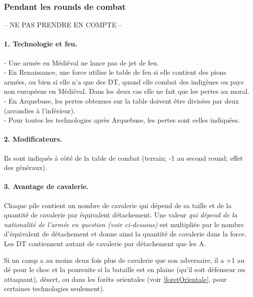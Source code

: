 \subsubsection{Pendant les rounds de combat}
-- NE PAS PRENDRE EN COMPTE --


\paragraph{1. Technologie et feu.}
- Une armée en Médiéval ne lance pas de jet de feu. \\
- En Renaissance, une force utilise le table de feu si elle contient des pions armées, ou bien
si elle n'a que des DT, quand elle combat des indigènes ou pays non européens en Médiéval.
Dans les deux cas elle ne fait que les pertes au moral. \\
- En Arquebuse, les pertes obtenues sur la table doivent être divisées par deux 
(arrondies à l'inférieur). \\
- Pour toutes les technologies après Arquebuse,  les pertes sont celles indiquées.

\paragraph{2. Modificateurs.}
Ils sont indiqués à côté de la table de combat (terrain; -1 au second round; 
effet des généraux).


\paragraph{3. Avantage de cavalerie.}
Chaque pile contient un nombre de cavalerie qui dépend de sa taille et 
de la quantité de cavalerie par équivalent détachement. Une valeur \textit{qui dépend 
de la nationalité de l'armée en question (voir ci-dessous)} est multipliée par 
le nombre d'équivalent de détachement et donne ainsi la quantité de cavalerie 
dans la force. Les DT contiennent autant de cavalerie  par détachement que les A.

Si un camp a au moins deux fois plus de cavalerie que son adversaire,
il a +1 au dé pour le choc et la poursuite si la bataille est en plaine 
(qu'il soit défenseur ou attaquant), désert, ou dans les forêts orientales (voir
\ref{foretOrientale}, pour certaines technologies seulement).


